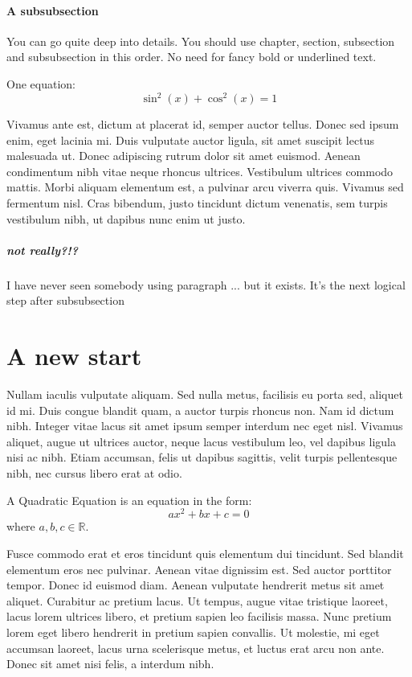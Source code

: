 \documentclass[11pt,a4paper,oneside]{report}
\begin{document}
\subsubsection{A subsubsection}
You can go quite deep into details. You should use chapter, section, 
subsection and subsubsection in this order. No need for fancy bold or
underlined text.

One equation:
\begin{equation}
    \sin^2(x) + \cos^2(x) = 1
\end{equation}

Vivamus ante est, dictum at placerat id, semper auctor tellus. Donec 
sed ipsum enim, eget lacinia mi. Duis vulputate auctor ligula, sit 
amet suscipit lectus malesuada ut. Donec adipiscing rutrum dolor sit 
amet euismod. Aenean condimentum nibh vitae neque rhoncus ultrices. 
Vestibulum ultrices commodo mattis. Morbi aliquam elementum est, a 
pulvinar arcu viverra quis. Vivamus sed fermentum nisl. Cras 
bibendum, justo tincidunt dictum venenatis, sem turpis vestibulum 
nibh, ut dapibus nunc enim ut justo. 

\paragraph{not really?!?}
I have never seen somebody using paragraph ... but it exists. It's
the next logical step after subsubsection

\chapter{A new start}
Nullam iaculis vulputate 
aliquam. Sed nulla metus, facilisis eu porta sed, aliquet id mi. 
Duis congue blandit quam, a auctor turpis rhoncus non. Nam id dictum 
nibh. Integer vitae lacus sit amet ipsum semper interdum nec eget 
nisl. Vivamus aliquet, augue ut ultrices auctor, neque lacus 
vestibulum leo, vel dapibus ligula nisi ac nibh. Etiam accumsan, 
felis ut dapibus sagittis, velit turpis pellentesque nibh, nec cursus
libero erat at odio.

A Quadratic Equation is an equation in the form:
\begin{equation}
    ax^2+bx+c=0
\end{equation}
where \(a,b,c\in\mathbb{R}\).

Fusce commodo erat et eros tincidunt quis elementum dui tincidunt. 
Sed blandit elementum eros nec pulvinar. Aenean vitae dignissim est. 
Sed auctor porttitor tempor. Donec id euismod diam. Aenean vulputate 
hendrerit metus sit amet aliquet. Curabitur ac pretium lacus. Ut 
tempus, augue vitae tristique laoreet, lacus lorem ultrices libero, 
et pretium sapien leo facilisis massa. Nunc pretium lorem eget libero
hendrerit in pretium sapien convallis. Ut molestie, mi eget accumsan 
laoreet, lacus urna scelerisque metus, et luctus erat arcu non ante. 
Donec sit amet nisi felis, a interdum nibh.
\end{document}
